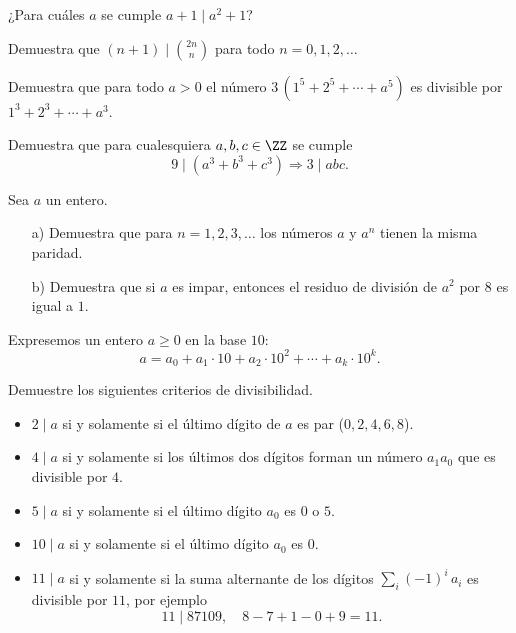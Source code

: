 \begin{ejercicio}
  ¿Para cuáles $a$ se cumple $a+1 \mid a^2 + 1$?
\end{ejercicio}

\begin{ejercicio}
  Demuestra que $(n+1) \mid {2n \choose n}$ para todo $n = 0,1,2,\ldots$
\end{ejercicio}

\begin{ejercicio}
  Demuestra que para todo $a > 0$ el número $3\,(1^5 + 2^5 + \cdots + a^5)$ es
  divisible por $1^3 + 2^3 + \cdots + a^3$.
\end{ejercicio}

\begin{ejercicio}
  Demuestra que para cualesquiera $a,b,c \in \ZZ$ se cumple
  $$9 \mid (a^3 + b^3 + c^3) \Longrightarrow 3 \mid abc.$$
\end{ejercicio}

\begin{ejercicio}
  Sea $a$ un entero.

  \begin{enumerate}
  \item[a)] Demuestra que para $n = 1,2,3,\ldots$ los números $a$ y $a^n$ tienen
    la misma paridad.

  \item[b)] Demuestra que si $a$ es impar, entonces el residuo de división de
    $a^2$ por $8$ es igual a $1$.
  \end{enumerate}
\end{ejercicio}

\begin{ejercicio}
  \label{ejerc:criterios-de-divisibilidad}
  Expresemos un entero $a \ge 0$ en la base $10$:
  $$a = a_0 + a_1\cdot 10 + a_2\cdot 10^2 + \cdots + a_k\cdot 10^k.$$

  Demuestre los siguientes criterios de divisibilidad.

  \begin{itemize}
  \item $2\mid a$ si y solamente si el último dígito de $a$ es par
    ($0, 2, 4, 6, 8$).

  \item $4\mid a$ si y solamente si los últimos dos dígitos forman un número
    $a_1 a_0$ que es divisible por $4$.

  \item $5\mid a$ si y solamente si el último dígito $a_0$ es $0$ o $5$.

  \item $10\mid a$ si y solamente si el último dígito $a_0$ es $0$.

  \item $11\mid a$ si y solamente si la suma alternante de los dígitos
    $\sum_i (-1)^i\,a_i$ es divisible por $11$, por ejemplo
    \[ 11\mid 87109, \quad 8 - 7 + 1 - 0 + 9 = 11. \]
  \end{itemize}
\end{ejercicio}

